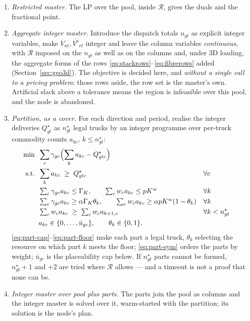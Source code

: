 \begin{enumerate}
\item \emph{Restricted master.} The LP over the pool, inside
  $\mathcal{R}$, gives the duals and the fractional point.

\item \emph{Aggregate integer master.} Introduce the dispatch totals
  $n_{gt}$ as explicit integer variables, make
  $\overline{V}_{nt},\overline{V^{\mathrm{e}}}_{rt}$ integer and leave
  the column variables \emph{continuous}, with $\mathcal{R}$ imposed on
  the $n_{gt}$ as well as on the columns and, under 3D loading, the
  aggregate forms of the rows \eqref{eq:stackrows}--\eqref{eq:fibrerows}
  added (Section~\ref{sec:geo3d}). The objective is decided
  here, and \emph{without a single call to a pricing problem}: those
  rows aside, the row set is the master's own. Artificial slack above a tolerance means the
  region is infeasible over this pool, and the node is abandoned.

\item \emph{Partition, as a cover.} For each direction and period,
  realise the integer deliveries $Q^{\star}_{gt}$ as $n^{\star}_{gt}$
  legal trucks by an integer programme over per-truck commodity counts
  $a_{kc}$, $k\le n^{\star}_{gt}$:
  \begin{align}
    \min\;\;&\sum_{c}\gamma_{gc}\Bigl(\sum_{k}a_{kc}-Q^{\star}_{gtc}\Bigr)
      \label{eq:part-obj}\\
    \text{s.t.}\;\;&\sum_{k}a_{kc}\;\ge\;Q^{\star}_{gtc} &&\forall c
      \label{eq:part-cover}\\
    &\textstyle\sum_{c}\gamma_{gc}a_{kc}\le\Gamma_{K},\qquad
     \sum_{c}w_{c}a_{kc}\le pK^{w} &&\forall k
      \label{eq:part-cap}\\
    &\textstyle\sum_{c}\gamma_{gc}a_{kc}\ge\alpha\Gamma_{K}\theta_{k},\qquad
     \sum_{c}w_{c}a_{kc}\ge\alpha pK^{w}(1-\theta_{k}) &&\forall k
      \label{eq:part-floor}\\
    &\textstyle\sum_{c}w_{c}a_{kc}\;\ge\;\sum_{c}w_{c}a_{k+1,c}
      &&\forall k<n^{\star}_{gt}
      \label{eq:part-sym}\\
    &a_{kc}\in\{0,\dots,\bar u_{gc}\},\qquad \theta_{k}\in\{0,1\}.\nonumber
  \end{align}
  \eqref{eq:part-cap}--\eqref{eq:part-floor} make each part a legal
  truck, $\theta_{k}$ selecting the resource on which part $k$ meets the
  floor; \eqref{eq:part-sym} orders the parts by weight; $\bar u_{gc}$
  is the placeability cap below. If $n^{\star}_{gt}$ parts cannot be
  formed, $n^{\star}_{gt}+1$ and $+2$ are tried where $\mathcal{R}$
  allows --- and a timeout is not a proof that none can be.

\item \emph{Integer master over pool plus parts.} The parts join the
  pool as columns and the integer master is solved over it,
  warm-started with the partition; its solution is the node's plan.
\end{enumerate}

